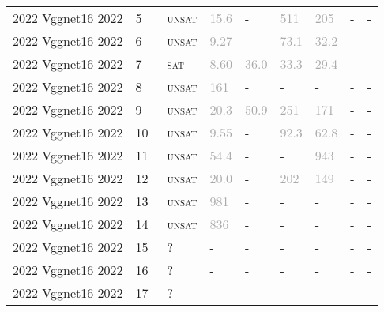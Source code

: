 \begin{center}
{\begin{longtable}{@{}lllllllll@{}}
2022 Vggnet16 2022 & 5 & ~\textsc{unsat} & \textcolor{darkgray}{15.6} & - & \textcolor{darkgray}{511} & \textcolor{darkgray}{205} & - & - \\
2022 Vggnet16 2022 & 6 & ~\textsc{unsat} & \textcolor{darkgray}{9.27} & - & \textcolor{darkgray}{73.1} & \textcolor{darkgray}{32.2} & - & - \\
2022 Vggnet16 2022 & 7 & ~\textsc{sat} & \textcolor{darkgray}{8.60} & \textcolor{darkgray}{36.0} & \textcolor{darkgray}{33.3} & \textcolor{darkgray}{29.4} & - & - \\
2022 Vggnet16 2022 & 8 & ~\textsc{unsat} & \textcolor{darkgray}{161} & - & - & - & - & - \\
2022 Vggnet16 2022 & 9 & ~\textsc{unsat} & \textcolor{darkgray}{20.3} & \textcolor{darkgray}{50.9} & \textcolor{darkgray}{251} & \textcolor{darkgray}{171} & - & - \\
2022 Vggnet16 2022 & 10 & ~\textsc{unsat} & \textcolor{darkgray}{9.55} & - & \textcolor{darkgray}{92.3} & \textcolor{darkgray}{62.8} & - & - \\
2022 Vggnet16 2022 & 11 & ~\textsc{unsat} & \textcolor{darkgray}{54.4} & - & - & \textcolor{darkgray}{943} & - & - \\
2022 Vggnet16 2022 & 12 & ~\textsc{unsat} & \textcolor{darkgray}{20.0} & - & \textcolor{darkgray}{202} & \textcolor{darkgray}{149} & - & - \\
2022 Vggnet16 2022 & 13 & ~\textsc{unsat} & \textcolor{darkgray}{981} & - & - & - & - & - \\
2022 Vggnet16 2022 & 14 & ~\textsc{unsat} & \textcolor{darkgray}{836} & - & - & - & - & - \\
2022 Vggnet16 2022 & 15 & ~? & - & - & - & - & - & - \\
2022 Vggnet16 2022 & 16 & ~? & - & - & - & - & - & - \\
2022 Vggnet16 2022 & 17 & ~? & - & - & - & - & - & - \\
\bottomrule
\end{longtable}
}
\end{center}


